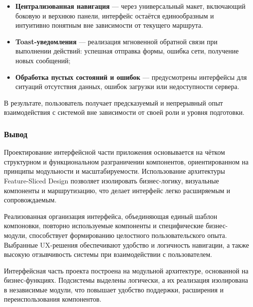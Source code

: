 \begin{itemize}
  \item \textbf{Централизованная навигация} — через универсальный макет, включающий боковую и верхнюю панели, интерфейс остаётся единообразным и интуитивно понятным вне зависимости от текущего маршрута.
  \item \textbf{Toast-уведомления} — реализация мгновенной обратной связи при выполнении действий: успешная отправка формы, ошибка сети, получение новых сообщений;
  \item \textbf{Обработка пустых состояний и ошибок} — предусмотрены интерфейсы для ситуаций отсутствия данных, ошибок загрузки или недоступности сервера.
\end{itemize}

В результате, пользователь получает предсказуемый и непрерывный опыт взаимодействия с системой вне зависимости от своей роли и уровня подготовки.

\subsubsection*{Вывод}

Проектирование интерфейсной части приложения основывается на чётком структурном и функциональном разграничении компонентов, ориентированном на принципы модульности и масштабируемости. Использование архитектуры Feature-Sliced Design позволяет изолировать бизнес-логику, визуальные компоненты и маршрутизацию, что делает интерфейс легко расширяемым и сопровождаемым.

Реализованная организация интерфейса, объединяющая единый шаблон компоновки, повторно используемые компоненты и специфические бизнес-модули, способствует формированию целостного пользовательского опыта. Выбранные UX-решения обеспечивают удобство и логичность навигации, а также высокую отзывчивость системы при взаимодействии с пользователем.


Интерфейсная часть проекта построена на модульной архитектуре, основанной на бизнес-функциях. Подсистемы выделены логически, а их реализация изолирована в независимые модули, что повышает удобство поддержки, расширения и переиспользования компонентов.